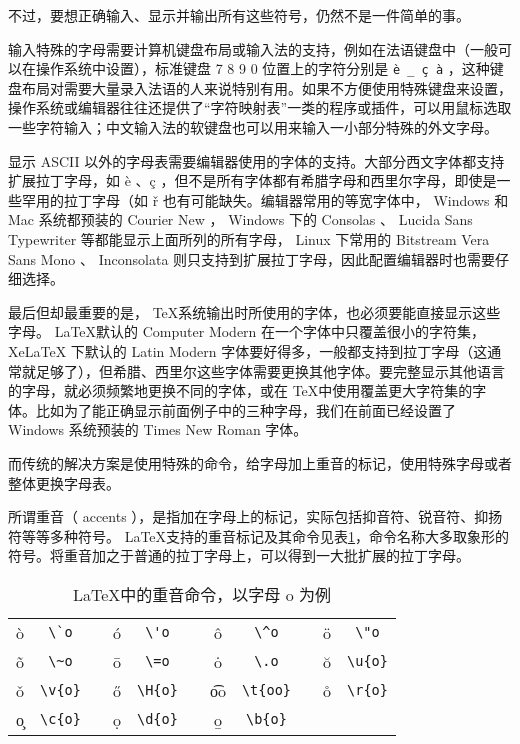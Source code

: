 不过，要想正确输入、显示并输出所有这些符号，仍然不是一件简单的事。

输入特殊的字母需要计算机键盘布局或输入法的支持，例如在法语键盘中（一般可以在操作系统中设置），标准键盘 7 8 9 0 位置上的字符分别是 \verb|è _ ç à| ，这种键盘布局对需要大量录入法语的人来说特别有用。如果不方便使用特殊键盘来设置，操作系统或编辑器往往还提供了“字符映射表”一类的程序或插件，可以用鼠标选取一些字符输入；中文输入法的软键盘也可以用来输入一小部分特殊的外文字母。

显示 ASCII 以外的字母表需要编辑器使用的字体的支持。大部分西文字体都支持扩展拉丁字母，如 è 、ç ，但不是所有字体都有希腊字母和西里尔字母，即使是一些罕用的拉丁字母（如 ř 也有可能缺失。编辑器常用的等宽字体中， Windows 和 Mac 系统都预装的 Courier New ， Windows 下的 Consolas 、 Lucida Sans Typewriter 等都能显示上面所列的所有字母， Linux 下常用的 Bitstream Vera Sans Mono 、 Inconsolata 则只支持到扩展拉丁字母，因此配置编辑器时也需要仔细选择。

最后但却最重要的是， \TeX 系统输出时所使用的字体，也必须要能直接显示这些字母。 \LaTeX 默认的 Computer Modern 在一个字体中只覆盖很小的字符集， XeLaTeX 下默认的 Latin Modern 字体要好得多，一般都支持到拉丁字母（这通常就足够了），但希腊、西里尔这些字体需要更换其他字体。要完整显示其他语言的字母，就必须频繁地更换不同的字体，或在 \TeX 中使用覆盖更大字符集的字体。比如为了能正确显示前面例子中的三种字母，我们在前面已经设置了 Windows 系统预装的 Times New Roman 字体。

而传统的解决方案是使用特殊的命令，给字母加上重音的标记，使用特殊字母或者整体更换字母表。

所谓重音（ accents ），是指加在字母上的标记，实际包括抑音符、锐音符、抑扬符等等多种符号。 \LaTeX 支持的重音标记及其命令见表\ref{tab:zhongyin}，命令名称大多取象形的符号。将重音加之于普通的拉丁字母上，可以得到一大批扩展的拉丁字母。

\begin{table}[H]
    \centering
    \caption{\LaTeX 中的重音命令，以字母 o 为例}
    \label{tab:zhongyin}
    \begin{tabular}{ccccccccccc}
        \toprule
        \`o & \verb|\`o| 
        & \qquad &
        \'o & \verb|\'o| 
        & \qquad &
        \^o & \verb|\^o| 
        & \qquad &
        \"o & \verb|\"o| \\
        \~o & \verb|\~o| 
        & \qquad &
        \=o & \verb|\=o| 
        & \qquad &
        \.o & \verb|\.o| 
        & \qquad &
        \u{o} & \verb|\u{o}| \\
        \v{o} & \verb|\v{o}| 
        & \qquad &
        \H{o} & \verb|\H{o}| 
        & \qquad &
        \t{oo} & \verb|\t{oo}| 
        & \qquad &
        \r{o} & \verb|\r{o}| \\
        \c{o} & \verb|\c{o}| 
        & \qquad &
        \d{o} & \verb|\d{o}| 
        & \qquad &
        \b{o} & \verb|\b{o}| 
        & \qquad &
         &  \\
    \bottomrule
    \end{tabular}
\end{table}

